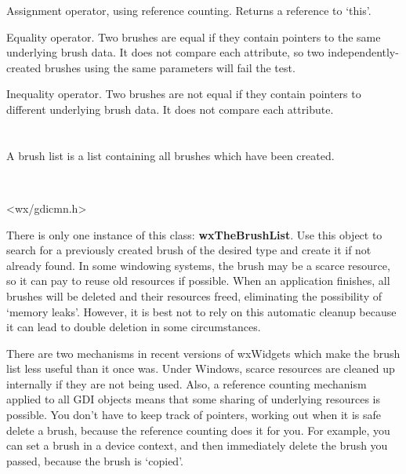 \label{wxbrushassignment}


Assignment operator, using reference counting. Returns a reference
to `this'.


\label{wxbrushequals}


Equality operator. Two brushes are equal if they contain pointers
to the same underlying brush data. It does not compare each attribute,
so two independently-created brushes using the same parameters will
fail the test.


\label{wxbrushnotequals}


Inequality operator. Two brushes are not equal if they contain pointers
to different underlying brush data. It does not compare each attribute.

\section{}\label{wxbrushlist}

A brush list is a list containing all brushes which have been created.


\\


<wx/gdicmn.h>


There is only one instance of this class: {\bf wxTheBrushList}.  Use
this object to search for a previously created brush of the desired
type and create it if not already found. In some windowing systems,
the brush may be a scarce resource, so it can pay to reuse old
resources if possible. When an application finishes, all brushes will
be deleted and their resources freed, eliminating the possibility of
`memory leaks'. However, it is best not to rely on this automatic
cleanup because it can lead to double deletion in some circumstances.

There are two mechanisms in recent versions of wxWidgets which make the
brush list less useful than it once was. Under Windows, scarce resources
are cleaned up internally if they are not being used. Also, a reference
counting mechanism applied to all GDI objects means that some sharing
of underlying resources is possible. You don't have to keep track of pointers,
working out when it is safe delete a brush, because the reference counting does
it for you. For example, you can set a brush in a device context, and then
immediately delete the brush you passed, because the brush is `copied'.

